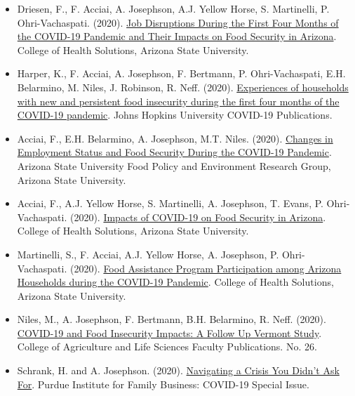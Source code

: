 \documentclass[letterpaper]{article}
\begin{document}
\begin{itemize}
\item Driesen, F., F. Acciai, A. Josephson, A.J. Yellow Horse, S. Martinelli, P. Ohri-Vachaspati. (2020). \href{https://keep.lib.asu.edu/items/270}{Job Disruptions During the First Four Months of the COVID-19 Pandemic and Their Impacts on Food Security in Arizona}. College of Health Solutions, Arizona State University. 
	
\item Harper, K., F. Acciai, A. Josephson, F. Bertmann, P. Ohri-Vachaspati, E.H. Belarmino, M. Niles, J. Robinson, R. Neff. (2020). \href{https://jscholarship.library.jhu.edu/handle/1774.2/63252}{Experiences of households with new and persistent food insecurity during the first four months of the COVID-19 pandemic}. Johns Hopkins University COVID-19 Publications. 

\item Acciai, F., E.H. Belarmino, A. Josephson, M.T. Niles. (2020). \href{https://keep.lib.asu.edu/items/245}{Changes in Employment Status and Food Security During the COVID-19 Pandemic}. Arizona State University Food Policy and Environment Research Group, Arizona State University. 
	
\item Acciai, F., A.J. Yellow Horse, S. Martinelli, A. Josephson, T. Evans, P. Ohri-Vachaspati. (2020). \href{https://keep.lib.asu.edu/items/242/view}{Impacts of COVID-19 on Food Security in Arizona}. College of Health Solutions, Arizona State University. 

\item Martinelli, S., F. Acciai, A.J. Yellow Horse, A. Josephson, P. Ohri-Vachaspati. (2020). \href{https://keep.lib.asu.edu/items/243}{Food Assistance Program Participation among Arizona Households during the COVID-19 Pandemic}. College of Health Solutions, Arizona State University.
	
\item Niles, M., A. Josephson, F. Bertmann, B.H. Belarmino, R. Neff. (2020). \href{https://scholarworks.uvm.edu/cgi/viewcontent.cgi?article=1026&context=calsfac}{COVID-19 and Food Insecurity Impacts: A Follow Up Vermont Study}. College of Agriculture and Life Sciences Faculty Publications. No. 26. 

\item Schrank, H. and A. Josephson. (2020). \href{https://ag.purdue.edu/agecon/fambiz/Documents/2020_Spring_PIFB_Newsletter.pdf}{Navigating a Crisis You Didn't Ask For}. Purdue Institute for Family Business: COVID-19 Special Issue.


\end{itemize}
\end{document}
